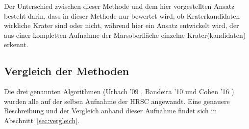 Der Unterschied zwischen dieser Methode und dem hier vorgestellten Ansatz besteht darin, dass in dieser Methode nur bewertet wird, ob Kraterkandidaten wirkliche Krater sind oder nicht, während hier ein Ansatz entwickelt wird, der aus einer kompletten Aufnahme der Marsoberfläche einzelne Krater(kandidaten) erkennt.

\subsection{Vergleich der Methoden}
\label{ssec:vergleich}

Die drei genannten Algorithmen (Urbach '09 \cite{urbach_stepinski_2009}, Bandeira '10 \cite{bandeira_10} und Cohen '16 \cite{cohen_16}) wurden alle auf der selben Aufnahme der HRSC angewandt. Eine genauere Beschreibung und der Vergleich anhand dieser Aufnahme findet sich in Abschnitt~\ref{sec:vergleich}.

